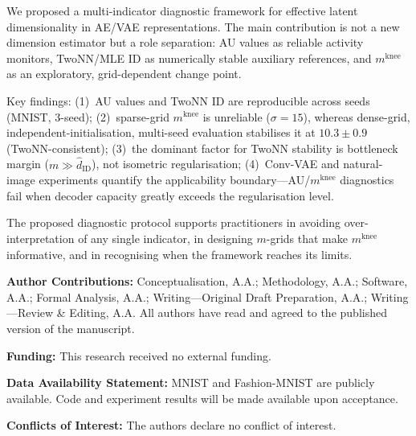 \documentclass[11pt,a4paper]{article}
\newcommand{\mknee}{m^{\mathrm{knee}}}
\newcommand{\hatdID}{\hat{d}_{\mathrm{ID}}}
\begin{document}
We proposed a multi-indicator diagnostic framework for effective latent
dimensionality in AE/VAE representations.
The main contribution is not a new dimension estimator but a role separation:
AU values as reliable activity monitors, TwoNN/MLE ID as numerically stable
auxiliary references, and $\mknee$ as an exploratory, grid-dependent change point.

Key findings:
(1)~AU values and TwoNN ID are reproducible across seeds (MNIST, 3-seed);
(2)~sparse-grid $\mknee$ is unreliable ($\sigma=15$), whereas dense-grid,
independent-initialisation, multi-seed evaluation stabilises it at
$10.3\pm0.9$ (TwoNN-consistent);
(3)~the dominant factor for TwoNN stability is bottleneck margin
($m\gg\hatdID$), not isometric regularisation;
(4)~Conv-VAE and natural-image experiments quantify the applicability
boundary---AU/$\mknee$ diagnostics fail when decoder capacity greatly
exceeds the regularisation level.

The proposed diagnostic protocol supports practitioners in avoiding
over-interpretation of any single indicator, in designing $m$-grids that make
$\mknee$ informative, and in recognising when the framework reaches its limits.

\vspace{1ex}
\noindent\textbf{Author Contributions:}
Conceptualisation, A.A.; Methodology, A.A.; Software, A.A.; Formal Analysis,
A.A.; Writing---Original Draft Preparation, A.A.; Writing---Review \& Editing,
A.A. All authors have read and agreed to the published version of the manuscript.

\noindent\textbf{Funding:} This research received no external funding.

\noindent\textbf{Data Availability Statement:}
MNIST and Fashion-MNIST are publicly available.
Code and experiment results will be made available upon acceptance.

\noindent\textbf{Conflicts of Interest:} The authors declare no conflict of interest.
\end{document}
